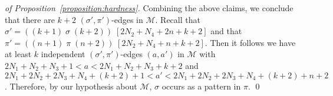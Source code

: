 \begin{proof}[of Proposition~\ref{proposition:hardness}]
  Combining the above claims, we conclude that there are
  $k+2$ $(\sigma', \pi')$-edges in $\mathcal{M}$.
  Recall that
  $\sigma' = ((k+1) \; \sigma \; (k+2)) \; [2N_2 + N_4 + 2n + k + 2]$ and that
  $\pi' = ((n+1) \; \pi \; (n+2)) \; [2N_2 + N_4 + n + k + 2]$.
  Then it follows we have
  at least $k$
  independent $(\sigma', \pi')$-edges
  $(a, a')$ in $\mathcal{M}$ with
  $2N_1 + N_2 + N_3 + 1 < a < 2N_1 + N_2 + N_3 + k + 2$
  and
  $2N_1 + 2N_2 + 2N_3 + N_4 + (k + 2) + 1 < a' <2N_1 + 2N_2 + 2N_3 + N_4 + (k + 2) + n + 2$.
  Therefore, by our hypothesis about $\mathcal{M}$,
  $\sigma$ occurs as a pattern in $\pi$.
  \qed
\end{proof}

